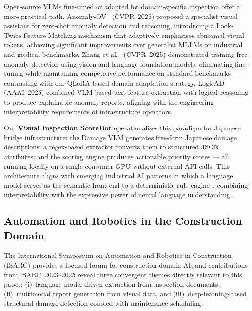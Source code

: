 \documentclass[twocolumn]{article}
\begin{document}
Open-source VLMs fine-tuned or adapted for domain-specific inspection offer
a more practical path.
Anomaly-OV~\cite{xu2025anomalyov} (CVPR~2025) proposed a specialist visual
assistant for zero-shot anomaly detection and reasoning, introducing a
Look-Twice Feature Matching mechanism that adaptively emphasises abnormal
visual tokens, achieving significant improvements over generalist MLLMs on
industrial and medical benchmarks.
Zhang et al.~\cite{zhang2025trainingfree} (CVPR~2025) demonstrated
training-free anomaly detection using vision and language foundation models,
eliminating fine-tuning while maintaining competitive performance on standard
benchmarks --- contrasting with our QLoRA-based domain adaptation strategy.
LogicAD~\cite{jin2025logicad} (AAAI~2025) combined VLM-based text feature
extraction with logical reasoning to produce explainable anomaly reports,
aligning with the engineering interpretability requirements of infrastructure
operators.

Our \textbf{Visual Inspection ScoreBot} operationalises this paradigm for
Japanese bridge infrastructure: the Damage VLM generates free-form Japanese
damage descriptions; a regex-based extractor converts them to structured
JSON attributes; and the scoring engine produces actionable priority
scores --- all running locally on a single consumer GPU without external API
calls.
This architecture aligns with emerging industrial AI patterns in which a
language model serves as the semantic front-end to a deterministic rule
engine~\cite{liu2024llava,dettmers2023qlora}, combining interpretability
with the expressive power of neural language understanding.

\subsection{Automation and Robotics in the Construction Domain}

The International Symposium on Automation and Robotics in Construction
(ISARC) provides a focused forum for construction-domain AI, and
contributions from ISARC~2023--2025 reveal three convergent themes
directly relevant to this paper: (i)~language-model-driven extraction
from inspection documents, (ii)~multimodal report generation from visual
data, and (iii)~deep-learning-based structural damage detection coupled
with maintenance scheduling.
\end{document}
